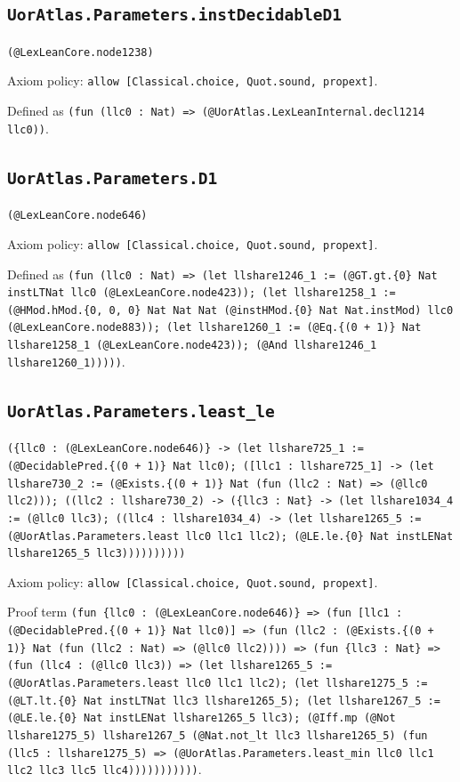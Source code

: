 \documentclass[11pt]{article}
\begin{document}
\subsection*{\texttt{UorAtlas.Parameters.instDecidableD1}}
\noindent\texttt{(@LexLeanCore.node1238)}\par
\noindent Axiom policy: \texttt{allow [Classical.choice, Quot.sound, propext]}.\par
\noindent Defined as \texttt{(fun (llc0 : Nat) => (@UorAtlas.LexLeanInternal.decl1214 llc0))}.\par
\subsection*{\texttt{UorAtlas.Parameters.D1}}
\noindent\texttt{(@LexLeanCore.node646)}\par
\noindent Axiom policy: \texttt{allow [Classical.choice, Quot.sound, propext]}.\par
\noindent Defined as \texttt{(fun (llc0 : Nat) => (let llshare1246\_1 := (@GT.gt.\{0\} Nat instLTNat llc0 (@LexLeanCore.node423)); (let llshare1258\_1 := (@HMod.hMod.\{0, 0, 0\} Nat Nat Nat (@instHMod.\{0\} Nat Nat.instMod) llc0 (@LexLeanCore.node883)); (let llshare1260\_1 := (@Eq.\{(0 + 1)\} Nat llshare1258\_1 (@LexLeanCore.node423)); (@And llshare1246\_1 llshare1260\_1)))))}.\par
\subsection*{\texttt{UorAtlas.Parameters.least\_le}}
\noindent\texttt{(\{llc0 : (@LexLeanCore.node646)\} -> (let llshare725\_1 := (@DecidablePred.\{(0 + 1)\} Nat llc0); ([llc1 : llshare725\_1] -> (let llshare730\_2 := (@Exists.\{(0 + 1)\} Nat (fun (llc2 : Nat) => (@llc0 llc2))); ((llc2 : llshare730\_2) -> (\{llc3 : Nat\} -> (let llshare1034\_4 := (@llc0 llc3); ((llc4 : llshare1034\_4) -> (let llshare1265\_5 := (@UorAtlas.Parameters.least llc0 llc1 llc2); (@LE.le.\{0\} Nat instLENat llshare1265\_5 llc3))))))))))}\par
\noindent Axiom policy: \texttt{allow [Classical.choice, Quot.sound, propext]}.\par
\noindent Proof term \texttt{(fun \{llc0 : (@LexLeanCore.node646)\} => (fun [llc1 : (@DecidablePred.\{(0 + 1)\} Nat llc0)] => (fun (llc2 : (@Exists.\{(0 + 1)\} Nat (fun (llc2 : Nat) => (@llc0 llc2)))) => (fun \{llc3 : Nat\} => (fun (llc4 : (@llc0 llc3)) => (let llshare1265\_5 := (@UorAtlas.Parameters.least llc0 llc1 llc2); (let llshare1275\_5 := (@LT.lt.\{0\} Nat instLTNat llc3 llshare1265\_5); (let llshare1267\_5 := (@LE.le.\{0\} Nat instLENat llshare1265\_5 llc3); (@Iff.mp (@Not llshare1275\_5) llshare1267\_5 (@Nat.not\_lt llc3 llshare1265\_5) (fun (llc5 : llshare1275\_5) => (@UorAtlas.Parameters.least\_min llc0 llc1 llc2 llc3 llc5 llc4)))))))))))}.\par
\end{document}
